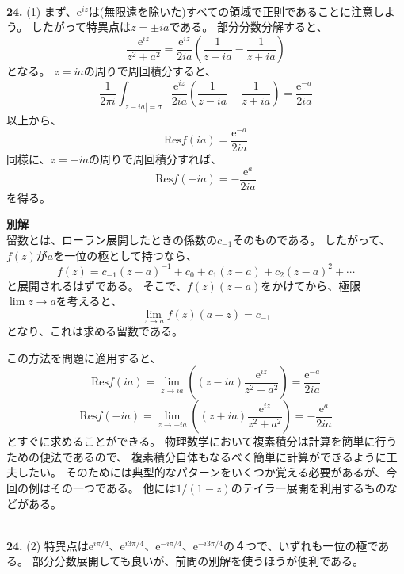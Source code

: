 \documentclass{jarticle}
\newcommand{\ans}[2]{\noindent\\ {\bf \large #1.} (#2)}
\newcommand{\e}{\mathrm e}
\begin{document}
\ans{24}{1}
まず、$\e^{iz}$は(無限遠を除いた)すべての領域で正則であることに注意しよう。
したがって特異点は$z = \pm i a$である。
部分分数分解すると、
\begin{equation}
  \frac{\e^{iz}}{z^2+a^2} = \frac{\e^{iz}}{2ia}
  \left(
  \frac{1}{z-ia} - \frac{1}{z+ia}
  \right)
\end{equation}
となる。
$z=ia$の周りで周回積分すると、
\begin{equation}
  \frac{1}{2\pi i} \int_{|z-ia|=\sigma} \frac{\e^{iz}}{2ia}
  \left(
  \frac{1}{z-ia} - \frac{1}{z+ia}
  \right)
  = \frac{\e^{-a}}{2ia}
\end{equation}
以上から、
\begin{equation}
  \mbox{Res} f(ia) = \frac{\e^{-a}}{2ia}
\end{equation}
同様に、$z=-ia$の周りで周回積分すれば、
\begin{equation}
  \mbox{Res} f(-ia) = - \frac{\e^{a}}{2ia}
\end{equation}
を得る。

{\bf 別解}\\
留数とは、ローラン展開したときの係数の$c_{-1}$そのものである。
したがって、$f(z)$が$a$を一位の極として持つなら、
\begin{equation}
  f(z) = c_{-1} (z-a)^{-1} + c_0 + c_1 (z-a) + c_2 (z-a)^2 + \cdots
\end{equation}
と展開されるはずである。
そこで、$f(z)(z-a)$をかけてから、極限$\lim z \rightarrow a$を考えると、
\begin{equation}
  \lim_{z \rightarrow a} f(z)(a-z) = c_{-1}
\end{equation}
となり、これは求める留数である。

この方法を問題に適用すると、
\begin{equation}
  \mbox{Res} f(ia) = \lim_{z \rightarrow ia} \left( (z-ia) \frac{\e^{iz}}{z^2+a^2} \right)
  = \frac{\e^{-a}}{2ia}
\end{equation}
\begin{equation}
  \mbox{Res} f(-ia) = \lim_{z \rightarrow -ia} \left( (z+ia) \frac{\e^{iz}}{z^2+a^2} \right)
  = -\frac{\e^{a}}{2ia}
\end{equation}
とすぐに求めることができる。
物理数学において複素積分は計算を簡単に行うための便法であるので、
複素積分自体もなるべく簡単に計算ができるように工夫したい。
そのためには典型的なパターンをいくつか覚える必要があるが、今回の例はその一つである。
他には$1/(1-z)$のテイラー展開を利用するものなどがある。

\ans{24}{2}
特異点は$\e^{i \pi /4}$、$\e^{i 3\pi /4}$、$\e^{-i \pi /4}$、$\e^{-i 3\pi /4}$の４つで、いずれも一位の極である。
部分分数展開しても良いが、前問の別解を使うほうが便利である。
\end{document}
